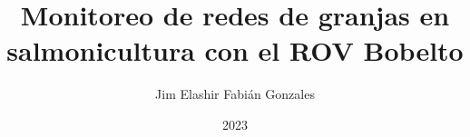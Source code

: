 \documentclass[a4paper,12pt,oneside]{tesisutec}
\begin{document}
\frontmatter


\title{Monitoreo de redes de granjas en salmonicultura con el ROV Bobelto}

\author{Jim Elashir Fabián Gonzales } %

\date{2023}

\maketitle



% 
% 

\tableofcontents

\newpage

\listoftables

\newpage

\listoffigures


\mainmatter
\pagestyle{fancy}

% 
 

% 
% 
% 
% 
% 

\renewcommand{\bibname}{\hfill\Large\bf{REFERENCIAS BIBLIOGRÁFICAS}\hfill}




\end{document}
